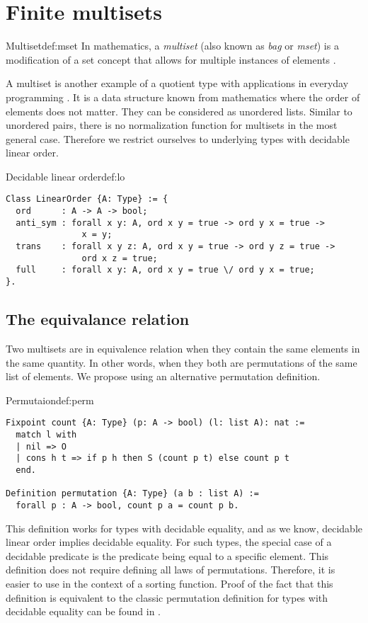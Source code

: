 \section{Finite multisets}
\begin{defi}{Multiset}{def:mset}
In mathematics, a \emph{multiset} (also known as \emph{bag} or \emph{mset}) is a modification of a set concept that allows for multiple instances of elements \cite{SetTheorey}.
\end{defi}
A multiset is another example of a quotient type with applications in everyday programming \cite{MSetApplic}. It is a data structure known from mathematics where the order of elements does not matter. They can be considered as unordered lists. Similar to unordered pairs, there is no normalization function for multisets in the most general case. Therefore we restrict ourselves to underlying types with decidable linear order.
\begin{defi}{Decidable linear order}{def:lo}
\begin{verbatim}
Class LinearOrder {A: Type} := {
  ord      : A -> A -> bool;
  anti_sym : forall x y: A, ord x y = true -> ord y x = true ->
               x = y;
  trans    : forall x y z: A, ord x y = true -> ord y z = true ->
               ord x z = true;
  full     : forall x y: A, ord x y = true \/ ord y x = true;
}.
\end{verbatim}
\end{defi}
\subsection{The equivalance relation}
Two multisets are in equivalence relation when they contain the same elements in the same quantity. In other words, when they both are permutations of the same list of elements. We propose using an alternative permutation definition. 
\begin{defi}{Permutaion}{def:perm}
\begin{verbatim}
Fixpoint count {A: Type} (p: A -> bool) (l: list A): nat :=
  match l with
  | nil => O
  | cons h t => if p h then S (count p t) else count p t
  end.

Definition permutation {A: Type} (a b : list A) :=
  forall p : A -> bool, count p a = count p b.
\end{verbatim}
\end{defi}
This definition works for types with decidable equality, and as we know, decidable linear order implies decidable equality. For such types, the special case of a decidable predicate is the predicate being equal to a specific element. This definition does not require defining all laws of permutations. Therefore, it is easier to use in the context of a sorting function. Proof of the fact that this definition is equivalent to the classic permutation definition for types with decidable equality can be found in .
